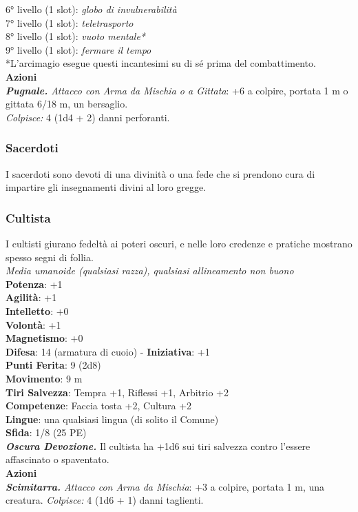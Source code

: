 \begin{multicols}{2}
6° livello (1 slot): \emph{globo di invulnerabilità}\\
7° livello (1 slot): \emph{teletrasporto}\\
8° livello (1 slot): \emph{vuoto mentale*}\\
9° livello (1 slot): \emph{fermare il tempo}\\
*L'arcimagio esegue questi incantesimi su di sé prima del  combattimento.\\
\smallskip\textbf{Azioni}\\
\emph{\textbf{Pugnale.} Attacco con Arma da Mischia o a Gittata}: +6 a colpire, portata 1 m o gittata 6/18 m, un bersaglio.\\
\emph{Colpisce:} 4 (1d4 + 2) danni perforanti.\\

\subsubsection{Sacerdoti}
I sacerdoti sono devoti di una divinità o una fede che si prendono cura di impartire gli insegnamenti divini al loro gregge.\\

\subsubsection{Cultista}
I cultisti giurano fedeltà ai poteri oscuri, e nelle loro credenze e pratiche mostrano spesso segni di follia.\\
\emph{Media umanoide (qualsiasi razza), qualsiasi allineamento non buono}\\
\textbf{Potenza}: +1\\
\textbf{Agilità}: +1\\
\textbf{Intelletto}: +0\\
\textbf{Volontà}: +1\\
\textbf{Magnetismo}: +0\\
\textbf{Difesa}: 14 (armatura di cuoio) - \textbf{Iniziativa}: +1\\
\textbf{Punti Ferita}: 9 (2d8)\\
\textbf{Movimento}: 9 m\\
\textbf{Tiri Salvezza}: Tempra +1, Riflessi +1, Arbitrio +2 \\
\textbf{Competenze}: Faccia tosta +2, Cultura +2\\
\textbf{Lingue}: una qualsiasi lingua (di solito il Comune)\\
\textbf{Sfida}: 1/8 (25 PE)\smallskip\\
\emph{\textbf{Oscura Devozione.}} Il cultista ha +1d6 sui tiri salvezza contro l'essere affascinato o spaventato.\\
\smallskip\textbf{Azioni}\\
\emph{\textbf{Scimitarra.} Attacco con Arma da Mischia}: +3 a colpire, portata 1 m, una creatura.
\emph{Colpisce:} 4 (1d6 + 1) danni taglienti.\\


\end{multicols}
